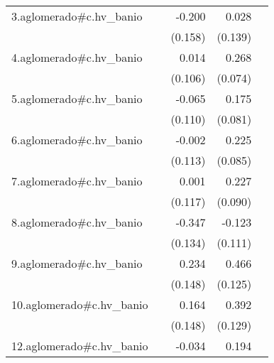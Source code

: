 {\begin{longtable}{l*{4}{D{.}{.}{-1}}}
\addlinespace
3.aglomerado#c.hv\_banio&                     &      -0.200         &       0.028         &                     \\
            &                     &     (0.158)         &     (0.139)         &                     \\
\addlinespace
4.aglomerado#c.hv\_banio&                     &       0.014         &       0.268\sym{***}&                     \\
            &                     &     (0.106)         &     (0.074)         &                     \\
\addlinespace
5.aglomerado#c.hv\_banio&                     &      -0.065         &       0.175\sym{*}  &                     \\
            &                     &     (0.110)         &     (0.081)         &                     \\
\addlinespace
6.aglomerado#c.hv\_banio&                     &      -0.002         &       0.225\sym{**} &                     \\
            &                     &     (0.113)         &     (0.085)         &                     \\
\addlinespace
7.aglomerado#c.hv\_banio&                     &       0.001         &       0.227\sym{*}  &                     \\
            &                     &     (0.117)         &     (0.090)         &                     \\
\addlinespace
8.aglomerado#c.hv\_banio&                     &      -0.347\sym{**} &      -0.123         &                     \\
            &                     &     (0.134)         &     (0.111)         &                     \\
\addlinespace
9.aglomerado#c.hv\_banio&                     &       0.234         &       0.466\sym{***}&                     \\
            &                     &     (0.148)         &     (0.125)         &                     \\
\addlinespace
10.aglomerado#c.hv\_banio&                     &       0.164         &       0.392\sym{**} &                     \\
            &                     &     (0.148)         &     (0.129)         &                     \\
\addlinespace
12.aglomerado#c.hv\_banio&                     &      -0.034         &       0.194         &                     \\

\end{longtable}}
